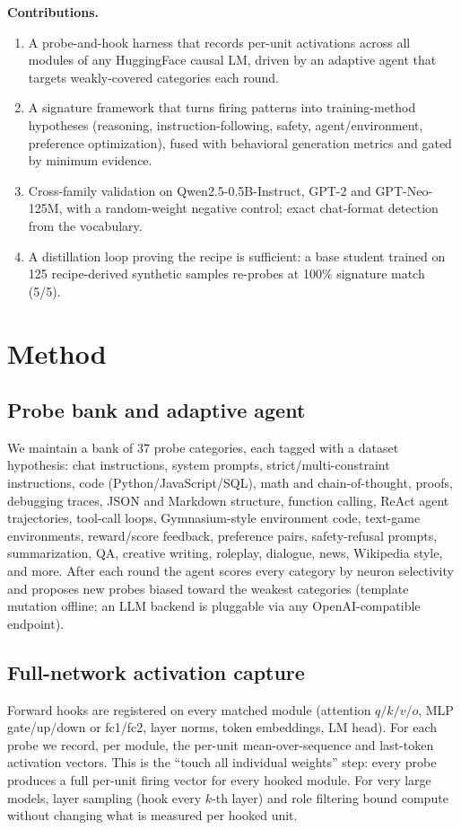 \documentclass[11pt]{article}
\begin{document}
\textbf{Contributions.}
\begin{enumerate}
  \item A probe-and-hook harness that records per-unit activations across all modules of
    any HuggingFace causal LM, driven by an adaptive agent that targets weakly-covered
    categories each round.
  \item A signature framework that turns firing patterns into training-method
    hypotheses (reasoning, instruction-following, safety, agent/environment,
    preference optimization), fused with behavioral generation metrics and gated by
    minimum evidence.
  \item Cross-family validation on Qwen2.5-0.5B-Instruct, GPT-2 and GPT-Neo-125M, with a
    random-weight negative control; exact chat-format detection from the vocabulary.
  \item A distillation loop proving the recipe is sufficient: a base student trained on
    125 recipe-derived synthetic samples re-probes at 100\% signature match (5/5).
\end{enumerate}

\section{Method}
\subsection{Probe bank and adaptive agent}
We maintain a bank of 37 probe categories, each tagged with a dataset hypothesis: chat
instructions, system prompts, strict/multi-constraint instructions, code
(Python/JavaScript/SQL), math and chain-of-thought, proofs, debugging traces, JSON and
Markdown structure, function calling, ReAct agent trajectories, tool-call loops,
Gymnasium-style environment code, text-game environments, reward/score feedback,
preference pairs, safety-refusal prompts, summarization, QA, creative writing, roleplay,
dialogue, news, Wikipedia style, and more. After each round the agent scores every
category by neuron selectivity and proposes new probes biased toward the weakest
categories (template mutation offline; an LLM backend is pluggable via any
OpenAI-compatible endpoint).

\subsection{Full-network activation capture}
Forward hooks are registered on every matched module (attention $q/k/v/o$, MLP
gate/up/down or fc1/fc2, layer norms, token embeddings, LM head). For each probe we
record, per module, the per-unit mean-over-sequence and last-token activation vectors.
This is the ``touch all individual weights'' step: every probe produces a full
per-unit firing vector for every hooked module. For very large models, layer sampling
(hook every $k$-th layer) and role filtering bound compute without changing what is
measured per hooked unit.
\end{document}
